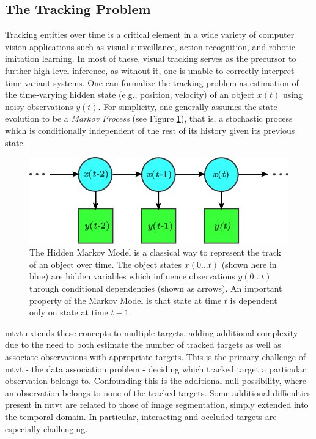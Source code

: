 \subsection{The Tracking Problem}
Tracking entities over time is a critical element in a wide variety of computer vision applications such as visual surveillance, action recognition, and robotic imitation learning. In most of these, visual tracking serves as the precursor to further high-level inference, as without it, one is unable to correctly interpret time-variant systems. One can formalize the tracking problem as estimation of the time-varying hidden state (e.g., position, velocity) of an object $x(t)$ using noisy observations $y(t)$. For simplicity, one generally assumes the state evolution to be a \emph{Markov Process} (see Figure \ref{fig:HMM}), that is, a stochastic process which is conditionally independent of the rest of its history given its previous state.    

\begin{figure}
\label{fig:HMM}
\centering
\includegraphics[width=0.9\linewidth]{figures/Introduction/HMM.pdf}
\caption[Hidden Markov Model]{The Hidden Markov Model is a classical way to represent the track of an object over time. The object states $x(0\dots t)$ (shown here in blue) are hidden variables which influence observations $y(0\dots t)$ through conditional dependencies (shown as arrows). An important property of the Markov Model is that state at time $t$ is dependent only on state at time $t-1$.}
\end{figure}

\gls{mtvt} extends these concepts to multiple targets, adding additional complexity due to the need to both estimate the number of tracked targets as well as associate observations with appropriate targets. This is the primary challenge of \gls{mtvt} - the data association problem - deciding which tracked target a particular observation belongs to. Confounding this is the additional null possibility, where an observation belongs to none of the tracked targets. Some additional difficulties present in \gls{mtvt} are related to those of image segmentation, simply extended into the temporal domain. In particular, interacting and occluded targets are especially challenging.

